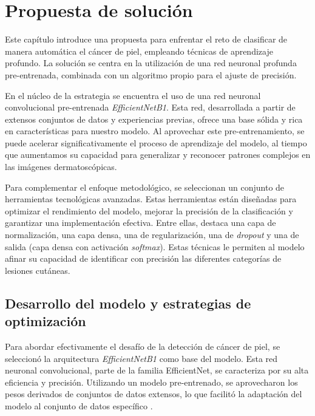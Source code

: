 \chapter{Propuesta de solución}\label{chapter:proposal}

Este capítulo introduce una propuesta para enfrentar el reto de clasificar de manera automática el cáncer de piel, empleando técnicas de aprendizaje profundo. La solución se centra en la utilización de una red neuronal profunda pre-entrenada, combinada con un algoritmo propio para el ajuste de precisión.

En el núcleo de la estrategia se encuentra el uso de una red neuronal convolucional pre-entrenada \textit{EfficientNetB1}. Esta red, desarrollada a partir de extensos conjuntos de datos y experiencias previas, ofrece una base sólida y rica en características para nuestro modelo. Al aprovechar este pre-entrenamiento, se puede acelerar significativamente el proceso de aprendizaje del modelo, al tiempo que aumentamos su capacidad para generalizar y reconocer patrones complejos en las imágenes dermatoscópicas.

Para complementar el enfoque metodológico, se seleccionan un conjunto de herramientas tecnológicas avanzadas. Estas herramientas están diseñadas para optimizar el rendimiento del modelo, mejorar la precisión de la clasificación y garantizar una implementación efectiva. Entre ellas, destaca una capa de normalización, una capa densa, una de regularización, una de \textit{dropout} y una de salida (capa densa con activación \textit{softmax}). Estas técnicas le permiten al modelo afinar su capacidad de identificar con precisión las diferentes categorías de lesiones cutáneas.

\section{Desarrollo del modelo y estrategias de optimización}\label{sec:method}

Para abordar efectivamente el desafío de la detección de cáncer de piel, se seleccionó la arquitectura \textit{EfficientNetB1}  como base del modelo. Esta red neuronal convolucional, parte de la familia EfficientNet, se caracteriza por su alta eficiencia y precisión. Utilizando un modelo pre-entrenado, se aprovecharon los pesos derivados de conjuntos de datos extensos, lo que facilitó la adaptación del modelo al conjunto de datos específico .

